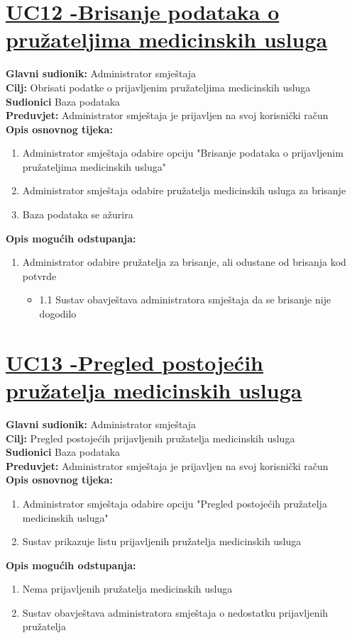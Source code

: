 \documentclass{article}
\begin{document}
	\section* {\underline{UC12 -Brisanje podataka o pružateljima medicinskih usluga}}
	\textbf{Glavni sudionik:} Administrator smještaja \\
	\textbf{Cilj:} Obrisati podatke o prijavljenim pružateljima medicinskih usluga \\
	\textbf{Sudionici} Baza podataka \\
	\textbf{Preduvjet:} Administrator smještaja je prijavljen na svoj korisnički račun \\
	\textbf{Opis osnovnog tijeka:}
	\begin{enumerate}
		\item Administrator smještaja odabire opciju "Brisanje podataka o prijavljenim pružateljima medicinskih usluga"
		\item Administrator smještaja odabire pružatelja medicinskih usluga za brisanje
		\item Baza podataka se ažurira
	\end{enumerate}
	\textbf{Opis mogućih odstupanja:}
	\begin{enumerate}
		\item Administrator odabire pružatelja za brisanje, ali odustane od brisanja kod potvrde
		\begin{itemize}
			\item 1.1 Sustav obavještava administratora smještaja da se brisanje nije dogodilo
		\end{itemize}
	\end{enumerate}
	
	\section* {\underline{UC13 -Pregled postojećih pružatelja medicinskih usluga}}
	\textbf{Glavni sudionik:} Administrator smještaja \\
	\textbf{Cilj:} Pregled postojećih prijavljenih pružatelja medicinskih usluga\\
	\textbf{Sudionici} Baza podataka \\
	\textbf{Preduvjet:} Administrator smještaja je prijavljen na svoj korisnički račun \\
	\textbf{Opis osnovnog tijeka:}
	\begin{enumerate}
		\item Administrator smještaja odabire opciju "Pregled postojećih pružatelja medicinskih usluga"
		\item Sustav prikazuje listu prijavljenih pružatelja medicinskih usluga
	\end{enumerate}
	\textbf{Opis mogućih odstupanja:}
	\begin{enumerate}
		\item Nema prijavljenih pružatelja medicinskih usluga
		\item Sustav obavještava administratora smještaja o nedostatku prijavljenih pružatelja
	\end{enumerate}
	
\end{document}
